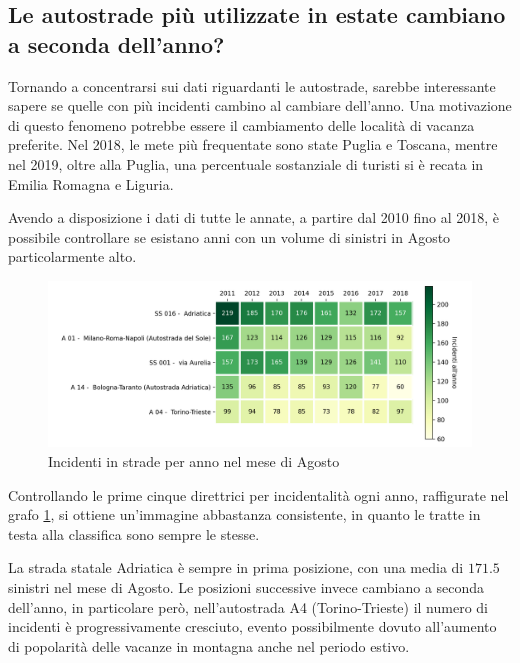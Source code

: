 \documentclass[a4paper,12pt]{report}
\begin{document}
\subsection{Le autostrade più utilizzate in estate cambiano a seconda dell'anno?}

Tornando a concentrarsi sui dati riguardanti le autostrade, 
sarebbe interessante sapere se quelle 
con più incidenti cambino al cambiare dell'anno. 
Una motivazione di questo fenomeno potrebbe essere il cambiamento 
delle località di vacanza preferite. 
Nel 2018, le mete più frequentate sono state Puglia e 
Toscana\cite{INFOGRAFICA_ISTAT:1}, mentre nel 2019, oltre alla Puglia, 
una percentuale sostanziale di turisti si è recata in 
Emilia Romagna e Liguria\cite{REPORT_ISTAT_2019:1}. 

Avendo a disposizione i dati di tutte le annate, a partire dal 2010 fino al 2018, 
è possibile controllare se esistano anni con un volume di 
sinistri in Agosto particolarmente alto. 

\begin{figure}
    \includegraphics[width=\linewidth]{../src/incidenti/incidenti_aci/agosto/vacanze_autostrade.png}
    \caption{Incidenti in strade per anno nel mese di Agosto}
    \label{fig:autostrade-anno}
\end{figure}

Controllando le prime cinque direttrici per incidentalità ogni anno, 
raffigurate nel grafo \ref{fig:autostrade-anno}, si ottiene un'immagine 
abbastanza consistente, in quanto le tratte in testa alla classifica sono 
sempre le stesse. 

La strada statale Adriatica è sempre in prima posizione, con una media di $171.5$ 
sinistri nel mese di Agosto. 
Le posizioni successive invece cambiano a seconda dell'anno, in particolare però, 
nell'autostrada A4 (Torino-Trieste) il numero di incidenti è progressivamente cresciuto, 
evento possibilmente dovuto all'aumento di popolarità delle vacanze 
in montagna anche nel periodo estivo. 
\end{document}
